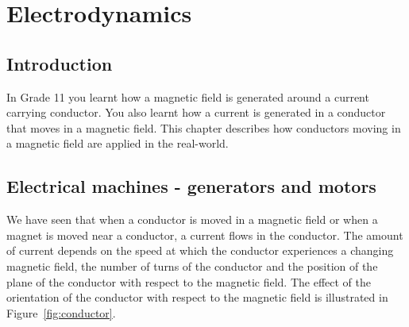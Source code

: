 \chapter{Electrodynamics}
\label{p:em:ed12}



\section{Introduction}
In Grade 11 you learnt how a magnetic field is generated around a current carrying conductor. You also learnt how a current is generated in a conductor that moves in a magnetic field. This chapter describes how conductors moving in a magnetic field are applied in the real-world. 
\section{Electrical machines - generators and motors}

We have seen that when a conductor is moved in a magnetic field or when a magnet is moved near a conductor, a current flows in the conductor. The amount of current depends on the speed at which the conductor experiences a changing magnetic field, the number of turns of the conductor and the position of the plane of the conductor with respect to the magnetic field. The effect of the orientation of the conductor with respect to the magnetic field is illustrated in Figure~\ref{fig:conductor}. 


